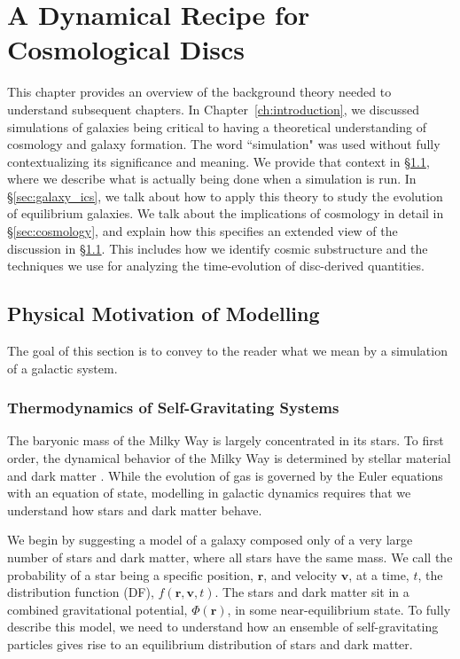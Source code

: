 \newcommand{\deriv}[3][]{%
  \ensuremath{\frac{\partial^{#1} {#2}}{\partial {#3}^{#1}}}}
\newtheorem{theorem}{Theorem}[section]

\chapter{A Dynamical Recipe for Cosmological Discs}\label{ch:background}
\newpage

This chapter provides an overview of the background theory needed to understand subsequent chapters. In Chapter~\ref{ch:introduction}, we discussed simulations of galaxies being critical to having a theoretical understanding of cosmology and galaxy formation. The word ``simulation" was used without fully contextualizing its significance and meaning. We provide that context in \S\ref{sec:motivation}, where we describe what is actually being done when a simulation is run. In \S\ref{sec:galaxy_ics}, we talk about how to apply this theory to study the evolution of equilibrium galaxies.  We talk about  the implications of cosmology in detail in \S\ref{sec:cosmology}, and explain how this specifies an extended view of the discussion in \S\ref{sec:motivation}. This includes how we identify cosmic substructure and the techniques we use for analyzing the time-evolution of disc-derived quantities. 
\section{Physical Motivation of Modelling} \label{sec:motivation}

The goal of this section is to convey to the reader what we mean by a simulation of a galactic system. 

\subsection{Thermodynamics of Self-Gravitating Systems}

The baryonic mass of the Milky Way is largely concentrated in its stars. To first order, the dynamical behavior of the Milky Way is determined by stellar material and dark matter \citep{BM}. While the evolution of gas is governed by the Euler equations with an equation of state, modelling in galactic dynamics requires that we understand how stars and dark matter behave. 

We begin by suggesting a model of a galaxy composed only of a very large number of stars and dark matter, where all stars have the same mass. We call the probability of a star being a specific position, $\textbf{r}$, and velocity $\textbf{v}$, at a time, $t$, the distribution function (DF), $f(\textbf{r},\textbf{v},t)$. The stars and dark matter sit in a combined gravitational potential, $\Phi(\textbf{r})$, in some near-equilibrium state. To fully describe this model, we need to understand how an ensemble of self-gravitating particles gives rise to an equilibrium distribution of stars and dark matter.

